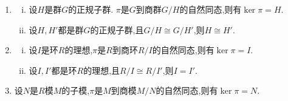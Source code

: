 \documentclass[../../main.tex]{subfiles}%
\begin{document}
\begin{proposition}\label{proposition:自然同态的ker等于商掉的正规子群}
\begin{enumerate}[(1)]
\item\label{proposition:自然同态的ker等于商掉的正规子群-1} \begin{enumerate}[(i)]
\item 设$H$是群$G$的正规子群. $\pi$是$G$到商群$G/H$的自然同态,则有$\ker\pi = H$.

\item 设$H,H'$都是群$G$的正规子群,且$G/H\cong G/H'$,则$H\cong H'$.
\end{enumerate}

\item\label{proposition:自然同态的ker等于商掉的正规子群-2} \begin{enumerate}[(i)]
\item\label{proposition:自然同态的ker等于商掉的正规子群-2-1} 设$I$是环$R$的理想,$\pi$是$R$到商环$R/I$的自然同态,则有$\ker\pi = I$.

\item\label{proposition:自然同态的ker等于商掉的正规子群-2-2} 设$I,I'$都是环$R$的理想,且$R/I\cong R/I'$,则$I = I'$.
\end{enumerate}

\item 设$N$是$R$模$M$的子模,$\pi$是$M$到商模$M/N$的自然同态,则有$\ker\pi = N$.
\end{enumerate}
\end{proposition}
\end{document}
